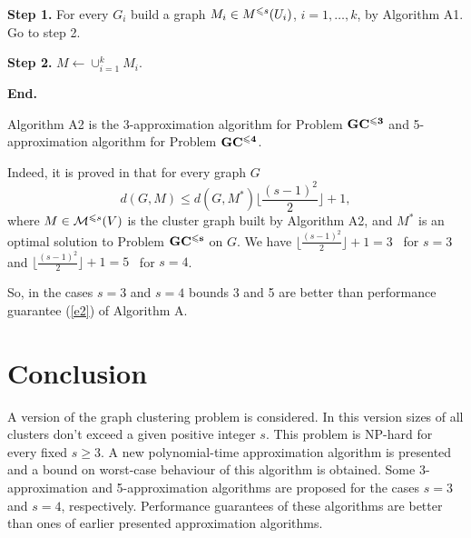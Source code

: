 \documentclass[runningheads]{llncs}
\begin{document}
\textbf{Step 1.} For every $G_i$ build a graph $M_i \in {\cal}M^{\leqslant s}(U_i)$, 
$i = 1, \dots , k$, by Algorithm A1. Go to step 2.

\textbf{Step 2.} $M \leftarrow \cup_{i =1}^k M_i$.

\textbf{End.}

\begin{theorem} \label{t5}
Algorithm A2 is the 3-approximation algorithm for Problem ${\bf GC^{\leqslant 3}}$
and 5-approximation algorithm for Problem ${\bf GC^{\leqslant 4}}$.
\end{theorem}

Indeed, it is proved in \cite{iin16} that for every graph $G$
$$
  d(G,M) \leqslant d(G,M^*) \Bigg\lfloor\frac{(s-1)^2}{2}\Bigg\rfloor+1,
$$
where $M \in {\cal M}^{\leqslant s}(V)$ is the cluster graph built 
by 
Algorithm A2, and $M^*$ is an optimal solution
to Problem ${\bf GC^{\leqslant s}}$ on $G$.
We have $\lfloor\frac{(s-1)^2}{2}\rfloor+1 =3$ \ for $s=3$
and $\lfloor\frac{(s-1)^2}{2}\rfloor+1 =5$ \ for $s=4$.

So, in the cases $s=3$ and $s=4$ bounds 3 and 5 are better than performance guarantee (\ref{e2})
of Algorithm A.

\medskip

\section*{Conclusion}

A version of the graph clustering problem is
considered. In this version sizes of all clusters don't exceed a
given positive integer $s$. This problem is NP-hard for every
fixed $s \geqslant 3$. A new polynomial-time approximation algorithm 
is presented and a bound on worst-case behaviour of this algorithm 
is obtained. 
Some 3-approximation and 5-approximation algorithms
are proposed for the cases $s=3$ and $s=4$, respectively. 
Performance guarantees of these algorithms are better 
than ones of earlier presented approximation algorithms.

\bigskip
\end{document}
